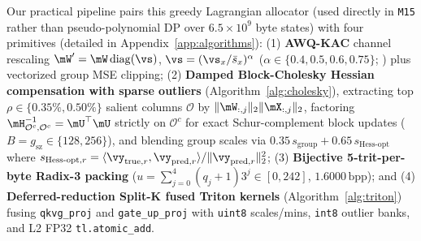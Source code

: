 \documentclass[10pt]{article} %
\newcommand{\bpp}{\mathrm{bpp}}
\begin{document}
Our practical pipeline pairs this greedy Lagrangian allocator (used directly in \texttt{M15} rather than pseudo-polynomial DP over $6.5\times 10^9$ byte states) with four primitives (detailed in Appendix~\ref{app:algorithms}): (1) \textbf{AWQ-KAC} channel rescaling $\mW' = \mW\,\mathrm{diag}(\vs)$, $\vs = (\vs_x / \bar{s}_x)^\alpha$ ($\alpha \in \{0.4, 0.5, 0.6, 0.75\}$; \citealp{lin2024awq}) plus vectorized group MSE clipping; (2) \textbf{Damped Block-Cholesky Hessian compensation with sparse outliers} (Algorithm~\ref{alg:cholesky}), extracting top $\rho \in \{0.35\%, 0.50\%\}$ salient columns $\mathcal{O}$ by $\|\mW_{:,j}\|_2\|\mX_{:,j}\|_2$, factoring $\mH_{\mathcal{O}^c,\mathcal{O}^c}^{-1} = \mU^\top\mU$ strictly on $\mathcal{O}^c$ for exact Schur-complement block updates ($B = g_{\text{sz}} \in \{128, 256\}$), and blending group scales via $0.35\,s_{\text{group}} + 0.65\,s_{\text{Hess-opt}}$ where $s_{\text{Hess-opt},r} = \langle \vy_{\text{true},r}, \vy_{\text{pred},r}\rangle / \|\vy_{\text{pred},r}\|_2^2$; (3) \textbf{Bijective 5-trit-per-byte Radix-3 packing} ($u = \sum_{j=0}^{4}(q_j+1)3^j \in [0,242]$, $1.6000\,\bpp$); and (4) \textbf{Deferred-reduction Split-K fused Triton kernels} (Algorithm~\ref{alg:triton}) fusing \texttt{qkvg\_proj} and \texttt{gate\_up\_proj} with \texttt{uint8} scales/mins, \texttt{int8} outlier banks, and L2 FP32 \texttt{tl.atomic\_add}.
\end{document}
